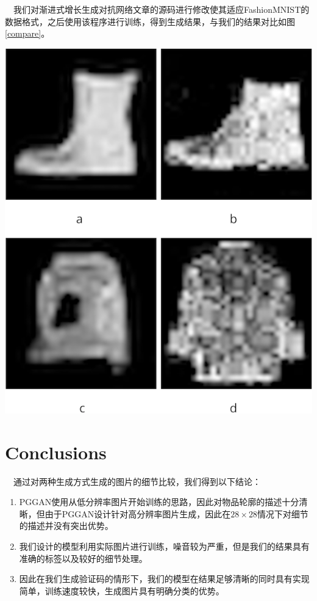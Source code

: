 \documentclass[12pt]{article}
\begin{document}
\ \ 我们对渐进式增长生成对抗网络\supercite{DBLP:journals/corr/abs-1710-10196}文章的源码进行修改使其适应FashionMNIST的数据格式，之后使用该程序进行训练，得到生成结果，与我们的结果对比如图\ref{compare}。
\begin{center}\vspace{1cm}
\includegraphics[width=0.7\linewidth]{compare.png}
\label{compare}
\end{center}\vspace{1cm}


\section*{Conclusions}

\ \ 通过对两种生成方式生成的图片的细节比较，我们得到以下结论：
\begin{enumerate}
	\item PGGAN\supercite{DBLP:journals/corr/abs-1710-10196}使用从低分辨率图片开始训练的思路，因此对物品轮廓的描述十分清晰，但由于PGGAN设计针对高分辨率图片生成，因此在$28 \times 28$情况下对细节的描述并没有突出优势。
	\item 我们设计的模型利用实际图片进行训练，噪音较为严重，但是我们的结果具有准确的标签以及较好的细节处理。
	\item 因此在我们生成验证码的情形下，我们的模型在结果足够清晰的同时具有实现简单，训练速度较快，生成图片具有明确分类的优势。
\end{enumerate}
\end{document}
